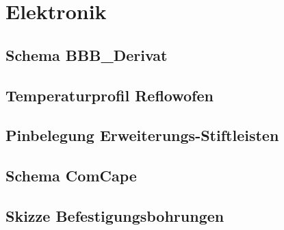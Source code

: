 \clearpage
\section{Elektronik}\label{sec:anhang_elektronikk}


%
%


\subsection{Schema BBB\_Derivat}\label{sec:anhang_schema_bbb_derivat}


\subsection{Temperaturprofil Reflowofen}\label{sec:anhang_reflowofen_temeperaturprofil}


\subsection{Pinbelegung Erweiterungs-Stiftleisten}\label{sec:anhang_pinbelegung}







\subsection{Schema ComCape}\label{sec:anhang_schema_comcape}


\subsection{Skizze Befestigungsbohrungen}\label{sec:anhang_befestigungsbohrungen}




